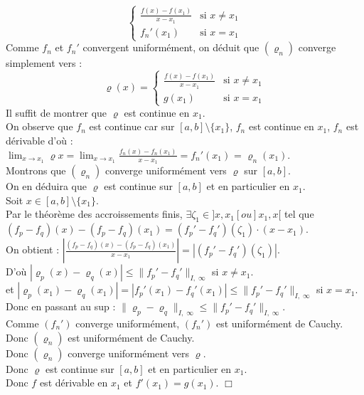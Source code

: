 \documentclass{article}
\begin{document}
{\[\begin{cases}
            \frac{f(x) - f(x_1)}{x - x_1} & \text{si } x \neq x_1\\
            f_n'(x_1) & \text{si } x = x_1
        \end{cases}
    \]
    Comme $f_n$ et $f_n'$ convergent uniformément, on déduit que $(\varrho_n)$ converge simplement vers :
    \[
        \varrho(x) = \begin{cases}
            \frac{f(x) - f(x_1)}{x - x_1} & \text{si } x \neq x_1\\
            g(x_1) & \text{si } x = x_1
        \end{cases}
    \]
    Il suffit de montrer que $\varrho$ est continue en $x_1$.\\
    On observe que $f_n$ est continue car sur $[a,b] \setminus \{x_1\}$, $f_n$ est continue en $x_1$, $f_n$ est dérivable d'où :\\
    $\lim_{x \to x_1} \varrho{x} = \lim_{x \to x_1} \frac{f_n(x) - f_n(x_1)}{x - x_1} = f_n'(x_1)$ = $\varrho_n(x_1)$.\\
    Montrons que $(\varrho_n)$ converge uniformément vers $\varrho$ sur $[a,b]$.\\
    On en déduira que $\varrho$ est continue sur $[a,b]$ et en particulier en $x_1$.\\
    Soit $x \in [a,b] \setminus \{x_1\}$.\\
    Par le théorème des accroissements finis, $\exists \zeta_1 \in ]x,x_1[ ou ]x_1,x[$ tel que $(f_p - f_q)(x) - (f_p - f_q)(x_1) = (f_p' - f_q')(\zeta_1) \cdot (x - x_1)$.\\
    On obtient : $|\frac{(f_p - f_q)(x) - (f_p - f_q)(x_1)}{x - x_1}| = |(f_p' - f_q')(\zeta_1)|$.\\
    D'où $|\varrho_p(x) - \varrho_q(x)| \leq \| f_p' - f_q' \|_{I,\;\infty}$ si $x \neq x_1$.\\
    et $|\varrho_p(x_1) - \varrho_q(x_1)| = |f_p'(x_1) - f_q'(x_1)| \leq \| f_p' - f_q' \|_{I,\;\infty}$ si $x = x_1$.\\
    Donc en passant au sup : $\| \varrho_p - \varrho_q \|_{I,\;\infty} \leq \| f_p' - f_q' \|_{I,\;\infty}$.\\
    Comme $(f_n')$ converge uniformément, $(f_n')$ est uniformément de Cauchy.\\
    Donc $(\varrho_n)$ est uniformément de Cauchy.\\
    Donc $(\varrho_n)$ converge uniformément vers $\varrho$.\\
    Donc $\varrho$ est continue sur $[a,b]$ et en particulier en $x_1$.\\
    Donc $f$ est dérivable en $x_1$ et $f'(x_1) = g(x_1)$. $\Box$
}
\end{document}
